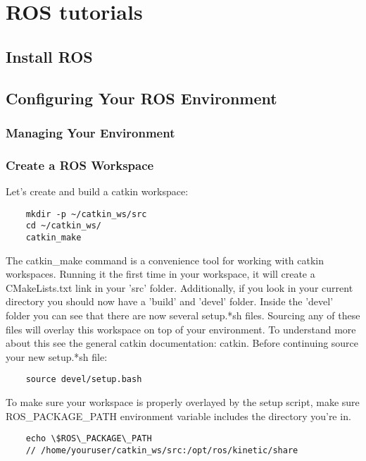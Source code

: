 
\chapter{ROS tutorials}

%
\section{Install ROS}

%
\section{Configuring Your ROS Environment}

%
\subsection{Managing Your Environment}

%
\subsection{Create a ROS Workspace}
Let's create and build a catkin workspace:
\begin{lstlisting}
	mkdir -p ~/catkin_ws/src
	cd ~/catkin_ws/
	catkin_make
\end{lstlisting}

The catkin\_make command is a convenience tool for working with catkin workspaces. Running it the first time in your workspace, it will create a CMakeLists.txt link in your 'src' folder. Additionally, if you look in your current directory you should now have a 'build' and 'devel' folder. Inside the 'devel' folder you can see that there are now several setup.*sh files. Sourcing any of these files will overlay this workspace on top of your environment. To understand more about this see the general catkin documentation: catkin. Before continuing source your new setup.*sh file:

\begin{lstlisting}
	source devel/setup.bash
\end{lstlisting}

To make sure your workspace is properly overlayed by the setup script, make sure ROS\_PACKAGE\_PATH environment variable includes the directory you're in.
\begin{lstlisting}
	echo \$ROS\_PACKAGE\_PATH
	// /home/youruser/catkin_ws/src:/opt/ros/kinetic/share
\end{lstlisting}

%

